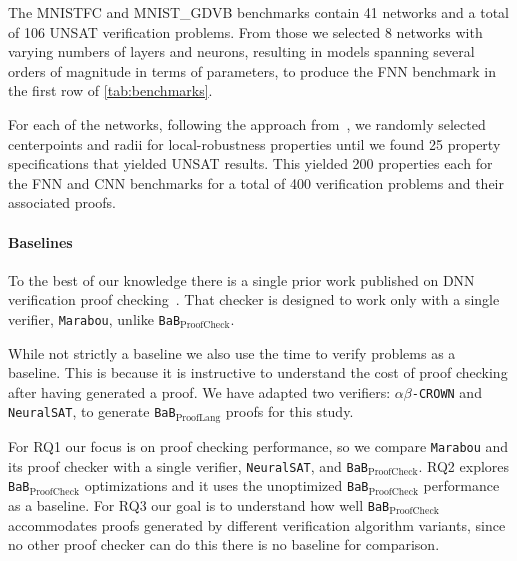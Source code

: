 \documentclass[oneside,11pt,dvipsnames]{book}
\newcommand{\prooflang}{\texttt{BaB$_{\text{ProofLang}}$}}
\newcommand{\proofcheck}{\texttt{BaB$_{\text{ProofCheck}}$}}
\newcommand{\crown}{\texttt{$\alpha\beta$-CROWN}}
\newcommand{\marabou}{\texttt{Marabou}}
\newcommand{\neuralsat}{\texttt{NeuralSAT}}
\begin{document}
The MNISTFC and MNIST\_GDVB benchmarks contain 41 networks and a total of 106 UNSAT verification problems.
From those we selected 8 networks with varying numbers of layers and neurons, resulting
in models spanning several orders of magnitude in terms of parameters, to produce
the FNN benchmark in the first row of \autoref{tab:benchmarks}.

For each of the networks, following the approach from~\cite{duong2024harnessing}, 
we randomly selected centerpoints and radii for local-robustness properties until we found 25 property specifications that yielded UNSAT results.  This yielded 200 properties
each for the FNN and CNN benchmarks for a total of 400 verification problems and
their associated proofs.

\paragraph{Baselines}
To the best of our knowledge there is a single prior work published
on DNN verification proof checking~\cite{desmartin2023towards}.
That checker is designed to work only with a single verifier, \marabou{}, 
unlike \proofcheck{}.

While not strictly a baseline we also use the time to verify problems
as a baseline.  This is because it is instructive to understand 
the cost of proof checking after having generated a proof.
We have adapted two verifiers: \crown{} and \neuralsat{}, to 
generate \prooflang{} proofs for this study.

For RQ1 our focus is on proof checking performance, so we compare
\marabou{} and its proof checker with a single verifier, \neuralsat{},
and \proofcheck{}.  
RQ2 explores \proofcheck{} optimizations and it uses the unoptimized
\proofcheck{} performance as a baseline.
For RQ3 our goal is to understand how well \proofcheck{} accommodates
proofs generated by different verification algorithm variants, since no
other proof checker can do this there is no baseline for comparison.
\end{document}
